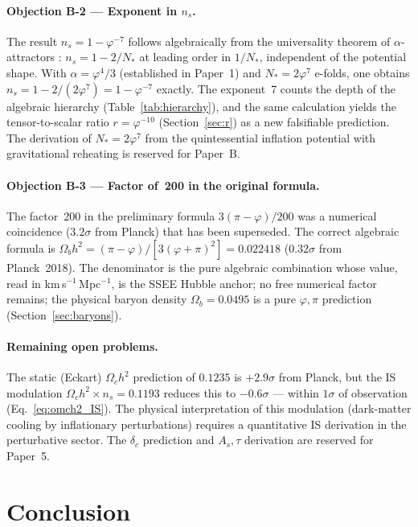 \documentclass[12pt,a4paper]{article}
\begin{document}
\paragraph{Objection B-2 — Exponent in $n_s$.}
The result $n_s = 1-\varphi^{-7}$ follows algebraically from the universality
theorem of $\alpha$-attractors \citep{KalloshLinde2013}: $n_s = 1-2/N_*$ at
leading order in $1/N_*$, independent of the potential shape.
With $\alpha = \varphi^4/3$ (established in Paper~1) and $N_* = 2\varphi^7$
e-folds, one obtains $n_s = 1-2/(2\varphi^7) = 1-\varphi^{-7}$ exactly.
The exponent~7 counts the depth of the algebraic hierarchy (Table~\ref{tab:hierarchy}),
and the same calculation yields the tensor-to-scalar ratio $r = \varphi^{-10}$
(Section~\ref{sec:r}) as a new falsifiable prediction.
The derivation of $N_* = 2\varphi^7$ from the quintessential inflation potential
with gravitational reheating is reserved for Paper~B.

\paragraph{Objection B-3 — Factor of~200 in the original formula.}
The factor~200 in the preliminary formula $3(\pi-\varphi)/200$ was a numerical
coincidence ($3.2\sigma$ from Planck) that has been superseded.
The correct algebraic formula is $\Omega_b h^2 = (\pi-\varphi)/[3(\varphi+\pi)^2] = 0.022418$ ($0.32\sigma$ from Planck~2018).
The denominator is the pure algebraic combination whose value, read in
km\,s$^{-1}$\,Mpc$^{-1}$, is the SSEE Hubble anchor; no free numerical factor
remains; the physical baryon density $\Omega_b = 0.0495$ is a pure $\varphi,\pi$
prediction (Section~\ref{sec:baryons}).

\paragraph{Remaining open problems.}
The static (Eckart) $\Omega_c h^2$ prediction of $0.1235$ is $+2.9\sigma$
from Planck, but the IS modulation $\Omega_c h^2 \times n_s = 0.1193$ reduces
this to $-0.6\sigma$ — within $1\sigma$ of observation (Eq.~\ref{eq:omch2_IS}).
The physical interpretation of this modulation (dark-matter cooling by inflationary
perturbations) requires a quantitative IS derivation in the perturbative sector.
The $\delta_c$ prediction and $A_s,\tau$ derivation are reserved for Paper~5.

\section{Conclusion}
\end{document}
